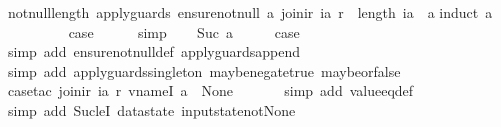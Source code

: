 \begin{isabellebody}
\endisatagproof
{\isafoldproof}%
%
\isadelimproof
\isanewline
%
\endisadelimproof
\isanewline
{}\isamarkupfalse%
\ not{\isacharunderscore}null{\isacharunderscore}length{\isacharcolon}\ {\isachardoublequoteopen}apply{\isacharunderscore}guards\ {\isacharparenleft}ensure{\isacharunderscore}not{\isacharunderscore}null\ a{\isacharparenright}\ {\isacharparenleft}join{\isacharunderscore}ir\ ia\ r{\isacharparenright}\ {\isasymLongrightarrow}\ length\ ia\ {\isasymge}\ a{\isachardoublequoteclose}\isanewline
%
\isadelimproof
%
\endisadelimproof
%
\isatagproof
{}\isamarkupfalse%
{\isacharparenleft}induct\ a{\isacharparenright}\isanewline
\ \ \isamarkupfalse%
\ {}\isanewline
\ \ \isamarkupfalse%
\ \isamarkupfalse%
\ {\isacharquery}case\isanewline
\ \ \ \ \isamarkupfalse%
\ simp\isanewline
{}\isamarkupfalse%
\isanewline
\ \ \isamarkupfalse%
\ {\isacharparenleft}Suc\ a{\isacharparenright}\isanewline
\ \ \isamarkupfalse%
\ \isamarkupfalse%
\ {\isacharquery}case\isanewline
\ \ \ \ \isamarkupfalse%
\ {\isacharparenleft}simp\ add{\isacharcolon}\ ensure{\isacharunderscore}not{\isacharunderscore}null{\isacharunderscore}def\ apply{\isacharunderscore}guards{\isacharunderscore}append{\isacharparenright}\isanewline
\ \ \ \ \isamarkupfalse%
\ {\isacharparenleft}simp\ add{\isacharcolon}\ apply{\isacharunderscore}guards{\isacharunderscore}singleton\ maybe{\isacharunderscore}negate{\isacharunderscore}true\ maybe{\isacharunderscore}or{\isacharunderscore}false{\isacharparenright}\isanewline
\ \ \ \ \isamarkupfalse%
\ {\isacharparenleft}case{\isacharunderscore}tac\ {\isachardoublequoteopen}join{\isacharunderscore}ir\ ia\ r\ {\isacharparenleft}vname{\isachardot}I\ a{\isacharparenright}\ {\isacharequal}\ None{\isachardoublequoteclose}{\isacharparenright}\isanewline
\ \ \ \ \ \isamarkupfalse%
\ {\isacharparenleft}simp\ add{\isacharcolon}\ value{\isacharunderscore}eq{\isacharunderscore}def{\isacharparenright}\isanewline
\ \ \ \ \isamarkupfalse%
\ {\isacharparenleft}simp\ add{\isacharcolon}\ Suc{\isacharunderscore}leI\ datastate{\isacharparenleft}{}{\isacharparenright}\ input{}state{\isacharunderscore}not{\isacharunderscore}None{\isacharparenright}\isanewline
{}\isamarkupfalse%
%
\endisatagproof
{\isafoldproof}%
%
\isadelimproof
\isanewline
%
\endisadelimproof
\isanewline
{}\isamarkupfalse%

\end{isabellebody}
